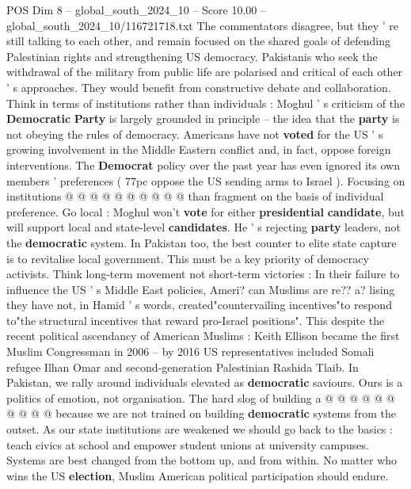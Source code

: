 \begin{textsample}{POS Dim 8 – global\_south\_2024\_10 – Score 10.00 – global\_south\_2024\_10/116721718.txt}
The commentators disagree, but they ' re still talking to each other, and remain focused on the shared goals of defending Palestinian rights and strengthening US democracy.
Pakistanis who seek the withdrawal of the military from public life are polarised and critical of each other ' s approaches.
They would benefit from constructive debate and collaboration.
Think in terms of institutions rather than individuals : Moghul ' s criticism of the \textbf{Democratic} \textbf{Party} is largely grounded in principle -- the idea that the \textbf{party} is not obeying the rules of democracy.
Americans have not \textbf{voted} for the US ' s growing involvement in the Middle Eastern conflict and, in fact, oppose foreign interventions.
The \textbf{Democrat} policy over the past year has even ignored its own members ' preferences ( 77pc oppose the US sending arms to Israel ).
Focusing on institutions @ @ @ @ @ @ @ @ @ @ than fragment on the basis of individual preference.
Go local : Moghul won't \textbf{vote} for either \textbf{presidential} \textbf{candidate}, but will support local and state-level \textbf{candidates}.
He ' s rejecting \textbf{party} leaders, not the \textbf{democratic} system.
In Pakistan too, the best counter to elite state capture is to revitalise local government.
This must be a key priority of democracy activists.
Think long-term movement not short-term victories : In their failure to influence the US ' s Middle East policies, Ameri? can Muslims are re?? a? lising they have not, in Hamid ' s words, created"countervailing incentives"to respond to"the structural incentives that reward pro-Israel positions".
This despite the recent political ascendancy of American Muslims : Keith Ellison became the first Muslim Congressman in 2006 -- by 2016 US representatives included Somali refugee Ilhan Omar and second-generation Palestinian Rashida Tlaib.
In Pakistan, we rally around individuals elevated as \textbf{democratic} saviours.
Ours is a politics of emotion, not organisation.
The hard slog of building a @ @ @ @ @ @ @ @ @ @ because we are not trained on building \textbf{democratic} systems from the outset.
As our state institutions are weakened we should go back to the basics : teach civics at school and empower student unions at university campuses.
Systems are best changed from the bottom up, and from within.
No matter who wins the US \textbf{election}, Muslim American political participation should endure.

\end{textsample}
